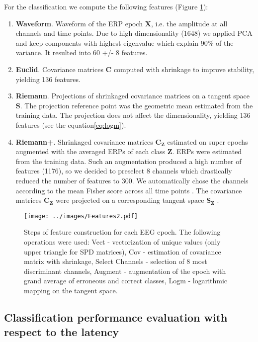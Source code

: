\documentclass[12pt]{iopart}
\begin{document}
For the classification we compute the following features (Figure \ref{fig:Features}):
\begin{enumerate}[label=F\arabic*]
    \item \textbf{Waveform}. Waveform of the ERP epoch $\mathbf{X}$, i.e. the amplitude at all channels and time points. Due to high
        dimensionality (1648) we applied PCA and keep components with highest eigenvalue
        which explain 90\% of the variance. It resulted into 60 +/- 8 features.
    \item \textbf{Euclid}. Covariance matrices $\mathbf{C}$ computed with shrinkage to improve stability, yielding 136 features.
    \item \textbf{Riemann}. Projections of shrinkaged covariance matrices on a tangent space $\mathbf{S}$. The projection reference
        point was the geometric mean estimated from the training data.
        The projection does not affect the dimensionality, yielding 136 features (see the equation\ref{eq:logm}).
    \item \textbf{Riemann+}. Shrinkaged covariance matrices $\mathbf{C_Z}$ estimated on super epochs augmented with the averaged ERPs
        of each class $\mathbf{Z}$. ERPs were estimated from the training data.
        Such an augmentation produced
        a high number of features (1176), so we decided to preselect 8 channels which
        drastically reduced the number of features to 300. We automatically chose
        the channels according to the mean Fisher score across all time points \cite{duda_pattern_2001}.
        The covariance matrices $\mathbf{C_Z}$ were projected on a corresponding tangent space $\mathbf{S_Z}$ .
\end{enumerate}


\begin{figure}[!t]
    \centering
    \texttt{[image: ../images/Features2.pdf]}
\caption{Steps of feature construction for each EEG epoch. The following operations were used:
    Vect - vectorization of unique values (only upper triangle for SPD matrices), Cov - estimation of covariance matrix with shrinkage,
Select Channels - selection of 8 most discriminant channels,
Augment - augmentation of the epoch with grand average of erroneous and correct classes,
Logm - logarithmic mapping on the tangent space.}
\label{fig:Features}
\end{figure}

\subsection{Classification performance evaluation with respect to the latency}
\end{document}
